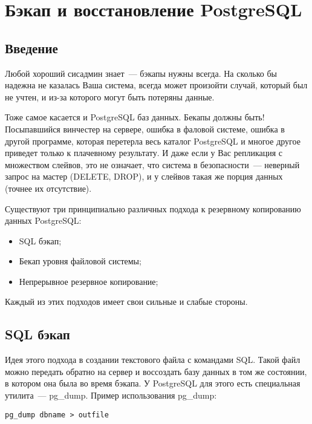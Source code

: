 \chapter{Бэкап и восстановление PostgreSQL}
\begin{epigraphs}
\end{epigraphs}
\section{Введение}
Любой хороший сисадмин знает~--- бэкапы нужны всегда. 
На сколько бы надежна не казалась Ваша система, всегда может произойти случай, который был не учтен, и из-за которого 
могут быть потеряны данные.

Тоже самое касается и PostgreSQL баз данных. Бекапы должны быть! Посыпавшийся винчестер на сервере, ошибка в фаловой системе, 
ошибка в другой программе, которая перетерла весь каталог PostgreSQL и многое другое приведет только к плачевному результату.
И даже если у Вас репликация с множеством слейвов, 
это не означает, что система в безопасности~--- неверный запрос на мастер (DELETE, DROP), и у слейвов такая же порция данных 
(точнее их отсутствие). 

Существуют три принципиально различных подхода к резервному копированию данных PostgreSQL:
\begin{itemize}
\item SQL бэкап;
\item Бекап уровня файловой системы;
\item Непрерывное резервное копирование;
\end{itemize}
Каждый из этих подходов имеет свои сильные и слабые стороны.


\section{SQL бэкап}
Идея этого подхода в создании текстового файла с командами SQL. Такой файл можно передать обратно на сервер 
и воссоздать базу данных в том же состоянии, в котором она была во время бэкапа. 
У PostgreSQL для этого есть специальная утилита~--- pg\_dump. Пример использования pg\_dump:
\begin{lstlisting}[label=lst:backups1,caption=Создаем бэкап с помощью pg\_dump]
pg_dump dbname > outfile
\end{lstlisting}

